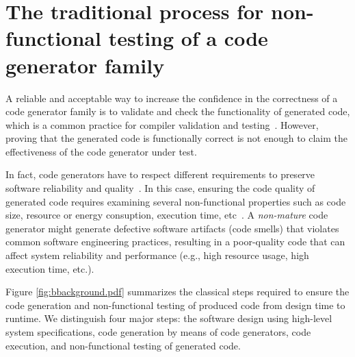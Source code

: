 
\section{The traditional process for non-functional testing of a code generator family}
A reliable and acceptable way to increase the confidence in the correctness of a code generator family is to validate and check the functionality of generated code, which is a common practice for compiler validation and testing~\cite{jorges2014back,stuermer2007systematic,sturmer2005overview}.
However, proving that the generated code is functionally correct is not enough to claim the effectiveness of the code generator under test. 

In fact, code generators have to respect different requirements to preserve software reliability and quality~\cite{demertzi2011analyzing}. 
In this case, ensuring the code quality of generated code requires examining several non-functional properties such as code size, resource or energy consuption, execution time, etc~\cite{pan2006fast}.
A \textit{non-mature} code generator might generate defective software artifacts (code smells) that violates common software engineering practices, resulting in a poor-quality code that can affect system reliability and performance (e.g., high resource usage, high execution time, etc.).


Figure \ref{fig:bbackground.pdf} summarizes the classical steps required to ensure the code generation and non-functional testing of produced code from design time to runtime. 
We distinguish four major steps: the software design using high-level system specifications, code generation by means of code generators, code execution, and non-functional testing of generated code. 


